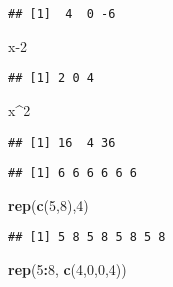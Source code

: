 \documentclass[
]{article}
\newenvironment{Shaded}{\begin{snugshade}}{\end{snugshade}}
\newcommand{\CommentTok}[1]{\textcolor[rgb]{0.56,0.35,0.01}{\textit{#1}}}
\newcommand{\DecValTok}[1]{\textcolor[rgb]{0.00,0.00,0.81}{#1}}
\newcommand{\KeywordTok}[1]{\textcolor[rgb]{0.13,0.29,0.53}{\textbf{#1}}}
\newcommand{\NormalTok}[1]{#1}
\newcommand{\OperatorTok}[1]{\textcolor[rgb]{0.81,0.36,0.00}{\textbf{#1}}}
\begin{document}
\begin{verbatim}
## [1]  4  0 -6
\end{verbatim}

\begin{Shaded}
\begin{Highlighting}[]
\NormalTok{x}\DecValTok{-2}
\end{Highlighting}
\end{Shaded}

\begin{verbatim}
## [1] 2 0 4
\end{verbatim}

\begin{Shaded}
\begin{Highlighting}[]
\NormalTok{x}\OperatorTok{^}\DecValTok{2}
\end{Highlighting}
\end{Shaded}

\begin{verbatim}
## [1] 16  4 36
\end{verbatim}

\begin{Shaded}
\end{Shaded}

\begin{verbatim}
## [1] 6 6 6 6 6 6
\end{verbatim}

\begin{Shaded}
\begin{Highlighting}[]
\KeywordTok{rep}\NormalTok{(}\KeywordTok{c}\NormalTok{(}\DecValTok{5}\NormalTok{,}\DecValTok{8}\NormalTok{),}\DecValTok{4}\NormalTok{)}
\end{Highlighting}
\end{Shaded}

\begin{verbatim}
## [1] 5 8 5 8 5 8 5 8
\end{verbatim}

\begin{Shaded}
\begin{Highlighting}[]
\KeywordTok{rep}\NormalTok{(}\DecValTok{5}\OperatorTok{:}\DecValTok{8}\NormalTok{, }\KeywordTok{c}\NormalTok{(}\DecValTok{4}\NormalTok{,}\DecValTok{0}\NormalTok{,}\DecValTok{0}\NormalTok{,}\DecValTok{4}\NormalTok{))}
\end{Highlighting}
\end{Shaded}
\end{document}
